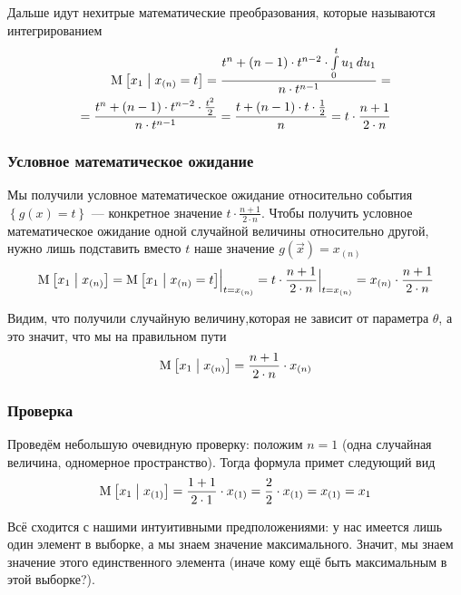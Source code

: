 Дальше идут нехитрые математические преобразования,
которые называются интегрированием
\begin{align*}
  \operatorname{M}_{} \left[ x_1 \;\middle|\; x_{\left( n \right)} = t \right]
  = \frac{t^n + \left( n-1 \right) \cdot t^{n-2} 
      \cdot \int\limits_{0}^{t} u_1 \, d u_1}{n \cdot t^{n-1}} = \\
  = \frac{t^n + \left( n-1 \right) \cdot t^{n-2}
      \cdot \frac{t^2}{2}}{n \cdot t^{n-1}}
  = \frac{t + \left( n-1 \right) \cdot t \cdot \frac{1}{2}}{n}
  = t \cdot \frac{n+1}{2 \cdot n}
\end{align*}

\subsubsection{Условное математическое ожидание}
Мы получили условное математическое ожидание относительно события
$\left\{ g\left( x \right) = t \right\}$ --- конкретное значение
$t \cdot \frac{n+1}{2 \cdot n}$.
Чтобы получить условное математическое ожидание одной случайной величины
относительно другой, нужно лишь подставить вместо $t$
наше значение $g\left( \vec{x} \right) = x_{\left( n \right)}$
$$\operatorname{M}_{} \left[ x_1 \;\middle|\; x_{\left( n \right)} \right]
  = \Bigl. \operatorname{M}_{} \left[ x_1 \;\middle|\; x_{\left( n \right)} = t \right]
      \Bigr|_{t = x_{\left( n \right)}}
  = \Bigl. t \cdot \frac{n+1}{2 \cdot n} \Bigr|_{t = x_{\left( n \right)}}
  = x_{\left( n \right)} \cdot \frac{n+1}{2 \cdot n}$$

Видим, что получили случайную величину,которая не зависит от параметра
$\theta$, а это значит, что мы на правильном пути
$$\operatorname{M}_{} \left[ x_1 \;\middle|\; x_{\left( n \right)} \right]
  = \frac{n+1}{2 \cdot n} \cdot x_{\left( n \right)}$$

\subsubsection{Проверка}
Проведём небольшую очевидную проверку: положим $n=1$ (одна случайная величина,
одномерное пространство). Тогда формула примет следующий вид
$$\operatorname{M}_{} \left[ x_1 \;\middle|\; x_{\left( 1 \right)} \right]
  = \frac{1+1}{2 \cdot 1} \cdot x_{\left( 1 \right)}
  = \frac{2}{2} \cdot x_{\left( 1 \right)}
  = x_{\left( 1 \right)} = x_1$$

Всё сходится с нашими интуитивными предположениями: у нас имеется лишь один
элемент в выборке, а мы знаем значение максимального. Значит, мы знаем
значение этого единственного элемента (иначе кому ещё быть максимальным
в этой выборке?).
